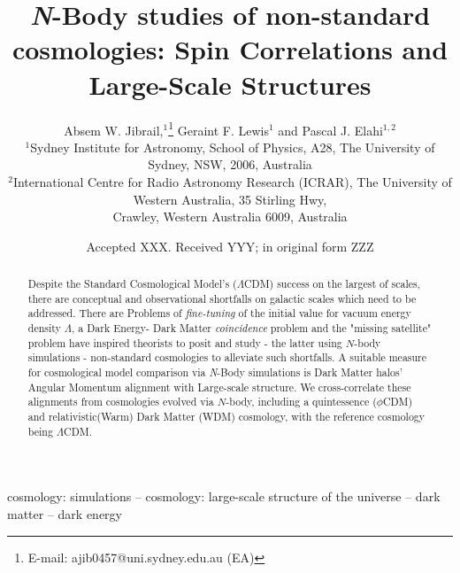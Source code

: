 \documentclass[a4paper,fleqn,usenatbib]{mnras}
\title[\textit{N}-Body studies of non-standard cosmologies]{ \textit{N}-Body studies of non-standard cosmologies: Spin Correlations and Large-Scale Structures }
\author[A. W. Jibrail et al.]{
Absem W. Jibrail,$^{1}$\thanks{E-mail: ajib0457@uni.sydney.edu.au (EA)}
Geraint F. Lewis$^{1}$
and Pascal J. Elahi$^{1,2}$
\\
$^{1}$Sydney Institute for Astronomy, School of Physics, A28, The University of Sydney, NSW, 2006, Australia\\
$^{2}$International Centre for Radio Astronomy Research (ICRAR), The University of Western Australia, 35 Stirling Hwy, \\
Crawley, Western Australia 6009, Australia}
\date{Accepted XXX. Received YYY; in original form ZZZ}
\begin{document}
\label{firstpage}
\pagerange{\pageref{firstpage}--\pageref{lastpage}}
\maketitle

\begin{abstract}
Despite the Standard Cosmological Model's ($\Lambda$CDM) success on the largest of scales, there are conceptual and observational shortfalls on galactic scales which need to be addressed. There are Problems of \textit{fine-tuning} of the initial value for vacuum energy density $\Lambda$, a Dark Energy- Dark Matter \textit{coincidence} problem and the "missing satellite" problem have inspired theorists to posit and study - the latter using $N$-body simulations - non-standard cosmologies to alleviate such shortfalls. A suitable measure for  cosmological model comparison via \textit{N}-Body simulations is Dark Matter halos' Angular Momentum alignment with Large-scale structure. We cross-correlate these alignments from cosmologies evolved via $N$-body, including a quintessence ($\phi$CDM) and relativistic(Warm) Dark Matter (WDM) cosmology, with the reference cosmology being $\Lambda$CDM.  

\end{abstract}

\begin{keywords}
cosmology: simulations -- cosmology: large-scale structure of the universe -- dark matter -- dark energy
\end{keywords}


\end{document}
